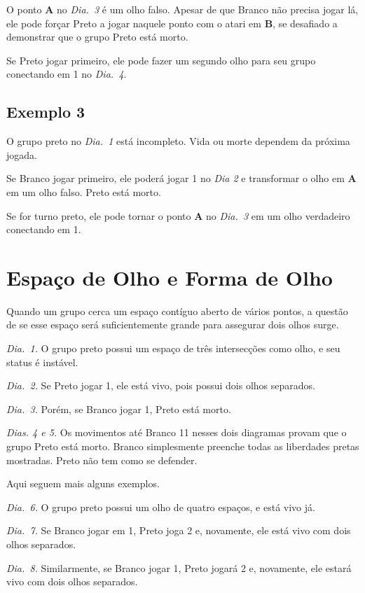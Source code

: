 O ponto \textbf{A} no \emph{Dia.\@~3} é um olho falso. Apesar de que Branco não precisa jogar lá, ele pode forçar Preto a jogar naquele ponto com o atari em \textbf{B}, se desafiado a demonstrar que o grupo Preto está morto.

Se Preto jogar primeiro, ele pode fazer um segundo olho para seu grupo conectando em 1 no \emph{Dia.\@~4}.

\subsection{Exemplo 3}

O grupo preto no \emph{Dia.\@~1} está incompleto. Vida ou morte dependem da próxima jogada.

Se Branco jogar primeiro, ele poderá jogar 1 no \emph{Dia 2} e transformar o olho em \textbf{A} em um olho falso. Preto está morto.

Se for turno preto, ele pode tornar o ponto \textbf{A} no \emph{Dia.\@~3} em um olho verdadeiro conectando em 1. 

\section{Espaço de Olho e Forma de Olho}

Quando um grupo cerca um espaço contíguo aberto de vários pontos, a questão de se esse espaço será suficientemente grande para assegurar dois olhos surge.

\emph{Dia.\@~1.} O grupo preto possui um espaço de três intersecções como olho, e seu status é instável.

\emph{Dia.\@~2.} Se Preto jogar 1, ele está vivo, pois possui dois olhos separados.

\emph{Dia.\@~3.} Porém, se Branco jogar 1, Preto está morto.

\emph{Dias. 4 e 5.} Os movimentos até Branco 11 nesses dois diagramas provam que o grupo Preto está morto. Branco simplesmente preenche todas as liberdades pretas mostradas. Preto não tem como se defender.

Aqui seguem mais alguns exemplos.

\emph{Dia.\@~6.} O grupo preto possui um olho de quatro espaços, e está vivo já.

\emph{Dia.\@~7.} Se Branco jogar em 1, Preto joga 2 e, novamente, ele está vivo com dois olhos separados.

\emph{Dia.\@~8.} Similarmente, se Branco jogar 1, Preto jogará 2 e, novamente, ele estará vivo com dois olhos separados.

